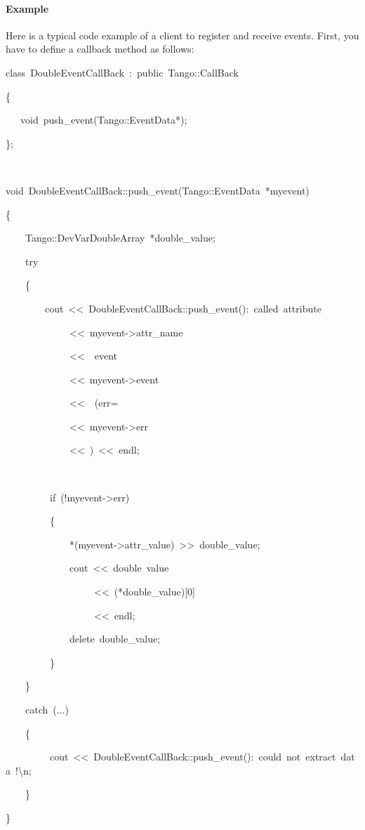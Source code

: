 \paragraph{Example}

Here is a typical code example of a client to register and receive
events. First, you have to define a callback method
as follows:


\begin{lyxcode}
class~DoubleEventCallBack~:~public~Tango::CallBack~

\{

~~~void~push\_event(Tango::EventData{*});

\};~

~



void~DoubleEventCallBack::push\_event(Tango::EventData~{*}myevent)

\{

~~~~Tango::DevVarDoubleArray~{*}double\_value;

~~~~try

~~~~\{

~~~~~~~~cout~<\textcompwordmark{}<~\textquotedbl{}DoubleEventCallBack::push\_event():~called~attribute~\textquotedbl{}~

~~~~~~~~~~~~~<\textcompwordmark{}<~myevent->attr\_name

~~~~~~~~~~~~~<\textcompwordmark{}<~\textquotedbl{}~event~\textquotedbl{}

~~~~~~~~~~~~~<\textcompwordmark{}<~myevent->event~

~~~~~~~~~~~~~<\textcompwordmark{}<~\textquotedbl{}~(err=\textquotedbl{}

~~~~~~~~~~~~~<\textcompwordmark{}<~myevent->err

~~~~~~~~~~~~~<\textcompwordmark{}<~\textquotedbl{})\textquotedbl{}~<\textcompwordmark{}<~endl;

~



~~~~~~~~~if~(!myevent->err)

~~~~~~~~~\{

~~~~~~~~~~~~~{*}(myevent->attr\_value)~>\textcompwordmark{}>~double\_value;

~~~~~~~~~~~~~cout~<\textcompwordmark{}<~\textquotedbl{}double~value~\textquotedbl{}

~~~~~~~~~~~~~~~~~~<\textcompwordmark{}<~({*}double\_value){[}0{]}

~~~~~~~~~~~~~~~~~~<\textcompwordmark{}<~endl;

~~~~~~~~~~~~~delete~double\_value;

~~~~~~~~~\}

~~~~\}

~~~~catch~(...)

~~~~\{

~~~~~~~~~cout~<\textcompwordmark{}<~\textquotedbl{}DoubleEventCallBack::push\_event():~could~not~extract~data~!\textbackslash{}n\textquotedbl{};

~~~~\}

\}
\end{lyxcode}


